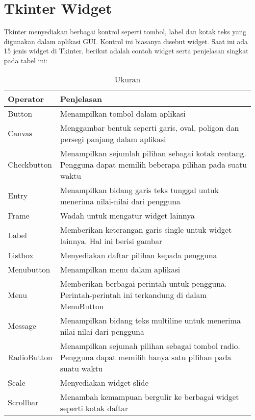 \documentclass [12pt,a4paper,notitlepage,oneside,bahasa]{article}
\begin{document}
\section{\textbf Tkinter Widget} \par
\noindent 
 \hspace*{0.5in} Tkinter menyediakan berbagai kontrol seperti tombol, label dan kotak teks yang digunakan dalam aplikasi GUI. 
 Kontrol ini biasanya disebut widget.
\noindent 
 \hspace*{0.5in} Saat ini ada 15 jenis widget di Tkinter. berikut adalah contoh widget serta penjelasan singkat pada tabel ini:




\begin{table}[h]
	\caption{Ukuran}
		\begin{center}
		\begin{tabular}{|l|l|}
			\hline
			Operator & Penjelasan \\
			\hline
			Button & Menampilkan tombol dalam aplikasi\\
			Canvas & Menggambar bentuk seperti garis, oval, 
			poligon dan persegi panjang dalam aplikasi\\
			Checkbutton & Menampilkan sejumlah pilihan 
			sebagai kotak centang. Pengguna dapat memilih beberapa pilihan pada suatu waktu\\
			Entry & Menampilkan bidang garis teks tunggal untuk menerima nilai-nilai dari pengguna\\
			Frame & Wadah untuk mengatur widget lainnya\\
			Label & Memberikan keterangan garis single untuk widget lainnya. Hal ini berisi gambar\\
			Listbox & Menyediakan daftar pilihan kepada pengguna\\
			Menubutton & Menampilkan menu dalam aplikasi\\
			Menu & Memberikan berbagai perintah untuk pengguna. Perintah-perintah ini terkandung di dalam MenuButton\\
			Message & Menampilkan bidang teks multiline untuk menerima nilai-nilai dari pengguna\\
			RadioButton & Menampilkan sejumah pilihan sebagai tombol radio. Pengguna dapat memilih hanya satu pilihan pada suatu waktu\\
			Scale & Menyediakan widget slide\\
			Scrollbar & Menambah kemampuan bergulir ke berbagai widget seperti kotak daftar\\

\end{tabular}
\end{center}
\end{table}
\end{document}

